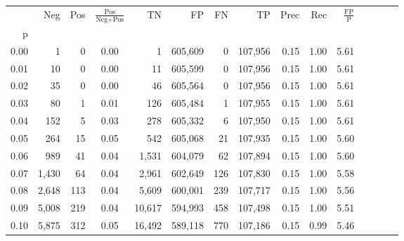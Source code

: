 \begin{tabular}{rrrcrrrrrrrrrrr}
\toprule
{} &     Neg &    Pos & $\frac{\text{Pos}}{\text{Neg}+\text{Pos}}$ &       TN &       FP &       FN &       TP &  Prec &   Rec & $\frac{\text{FP}}{\text{P}}$ \\
p    &         &        &                                            &          &          &          &          &       &       &                              \\
\midrule
0.00 &       1 &      0 &                                       0.00 &        1 &  605,609 &        0 &  107,956 &  0.15 &  1.00 &                         5.61 \\
0.01 &      10 &      0 &                                       0.00 &       11 &  605,599 &        0 &  107,956 &  0.15 &  1.00 &                         5.61 \\
0.02 &      35 &      0 &                                       0.00 &       46 &  605,564 &        0 &  107,956 &  0.15 &  1.00 &                         5.61 \\
0.03 &      80 &      1 &                                       0.01 &      126 &  605,484 &        1 &  107,955 &  0.15 &  1.00 &                         5.61 \\
0.04 &     152 &      5 &                                       0.03 &      278 &  605,332 &        6 &  107,950 &  0.15 &  1.00 &                         5.61 \\
0.05 &     264 &     15 &                                       0.05 &      542 &  605,068 &       21 &  107,935 &  0.15 &  1.00 &                         5.60 \\
0.06 &     989 &     41 &                                       0.04 &    1,531 &  604,079 &       62 &  107,894 &  0.15 &  1.00 &                         5.60 \\
0.07 &   1,430 &     64 &                                       0.04 &    2,961 &  602,649 &      126 &  107,830 &  0.15 &  1.00 &                         5.58 \\
0.08 &   2,648 &    113 &                                       0.04 &    5,609 &  600,001 &      239 &  107,717 &  0.15 &  1.00 &                         5.56 \\
0.09 &   5,008 &    219 &                                       0.04 &   10,617 &  594,993 &      458 &  107,498 &  0.15 &  1.00 &                         5.51 \\
0.10 &   5,875 &    312 &                                       0.05 &   16,492 &  589,118 &      770 &  107,186 &  0.15 &  0.99 &                         5.46 \\

\end{tabular}
